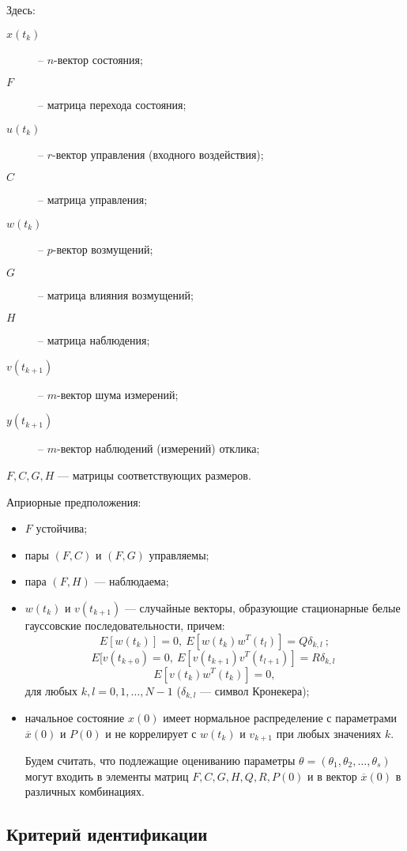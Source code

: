 \documentclass[a4paper,14pt]{extarticle}
\renewcommand{\vec}[1]{#1}
\begin{document}
Здесь:
\begin{description}
  \item [$\vec{x}(t_k)$] -- $n$-вектор состояния;
  \item [$F$] -- матрица перехода состояния;
  \item [$\vec{u}(t_k)$] -- $r$-вектор управления (входного воздействия);
  \item [$C$] -- матрица управления;
  \item [$\vec{w}(t_k)$] -- $p$-вектор возмущений;
  \item [$G$] -- матрица влияния возмущений;
  \item [$H$] -- матрица наблюдения;
  \item [$\vec{v}(t_{k+1})$] -- $m$-вектор шума измерений;
  \item [$\vec{y}(t_{k+1})$] -- $m$-вектор наблюдений (измерений) отклика;
\end{description}


$F, C, G, H$ --- матрицы соответствующих размеров.

\bigskip
Априорные предположения:
\begin{itemize}
\item $F$ устойчива;
\item пары $(F, C)$ и $(F, G)$ управляемы;
\item пара $(F, H)$ --- наблюдаема;
\item $\vec{w}(t_k)$ и $\vec{v}(t_{k+1})$ --- случайные векторы, образующие
стационарные белые гауссовские последовательности, причем:
\[
E[\vec{w}(t_k)] = 0,\ E[\vec{w}(t_k)\vec{w}^{T}(t_l)] = Q \delta_{k,l}\ ;
\]
\[
E[\vec{v}(t_{k+0}) = 0,\ E[\vec{v}(t_{k+1})\vec{v}^{T}(t_{l+1})] = R
\delta_{k,l}\;
\]
\[
E[\vec{v}(t_k)\vec{w}^{T}(t_k)] = 0,
\]
для любых $k, l = 0, 1, \ldots, N-1$ ($\delta_{k,l}$ --- символ Кронекера);

\item начальное состояние $\vec{x}(0)$ имеет нормальное распределение с
параметрами $\overline{\vec{x}}(0)$ и $P(0)$ и не коррелирует с $\vec{w(t_k)}$
и $\vec{v_{k+1}}$ при любых значениях $k$.

Будем считать, что подлежащие оцениванию параметры $\theta = (\theta_1,
\theta_2, \ldots, \theta_s)$ могут входить в элементы матриц $F, C, G, H, Q, R,
P(0)$ и в вектор $\overline{\vec{x}}(0)$ в различных комбинациях.

\end{itemize}

\subsection{Критерий идентификации}
\end{document}
